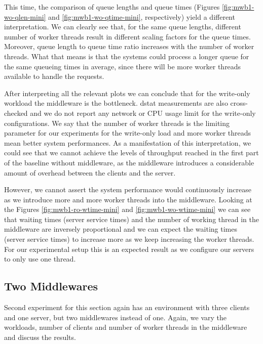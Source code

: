 \documentclass[11pt,a4paper]{article}
\begin{document}
\par This time, the comparison of queue lengths and queue times (Figures \ref{fig:mwb1-wo-qlen-mini} and \ref{fig:mwb1-wo-qtime-mini}, respectively) yield a different interpretation. We can clearly see that, for the same queue lengths, different number of worker threads result in different scaling factors for the queue times. Moreover, queue length to queue time ratio increases with the number of worker threads. What that means is that the systems could process a longer queue for the same queueing times in average, since there will be more worker threads available to handle the requests.
\par After interpreting all the relevant plots we can conclude that for the write-only workload the middleware is the bottleneck. dstat measurements are also cross-checked and we do not report any network or CPU usage limit for the write-only configurations. We say that the number of worker threads is the limiting parameter for our experiments for the write-only load and more worker threads mean better system performances. As a manifestation of this interpretation, we could see that we cannot achieve the levels of throughput reached in the first part of the baseline without middleware, as the middleware introduces a considerable amount of overhead between the clients and the server.
\par However, we cannot assert the system performance would continuously increase as we introduce more and more worker threads into the middleware. Looking at the Figures \ref{fig:mwb1-ro-wtime-mini} and \ref{fig:mwb1-wo-wtime-mini} we can see that waiting times (server service times) and the number of working thread in the middleware are inversely proportional and we can expect the waiting times (server service times) to increase more as we keep increasing the worker threads. For our experimental setup this is an expected result as we configure our servers to only use one thread. 

\subsection{Two Middlewares} \label{sec:mwb2}
Second experiment for this section again has an environment with three clients and one server, but two middlewares instead of one. Again, we vary the workloads, number of clients and number of worker threads in the middleware and discuss the results.
\end{document}
